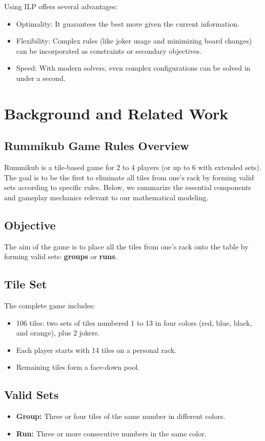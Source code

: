\documentclass[11pt,letterpaper]{article}
\begin{document}
Using ILP offers several advantages:
\begin{itemize}
    \item Optimality: It guarantees the best move given the current information.
    \item Flexibility: Complex rules (like joker usage and minimizing board changes) can be incorporated as constraints or secondary objectives.
    \item Speed: With modern solvers, even complex configurations can be solved in under a second.
\end{itemize}

\section*{Background and Related Work}
\subsection*{Rummikub Game Rules Overview}
Rummikub is a tile-based game for 2 to 4 players (or up to 6 with extended sets). The goal is to be the first to eliminate all tiles from one's rack by forming valid sets according to specific rules. Below, we summarize the essential components and gameplay mechanics relevant to our mathematical modeling.

\subsection*{Objective}
The aim of the game is to place all the tiles from one's rack onto the table by forming valid sets: \textbf{groups} or \textbf{runs}.

\subsection*{Tile Set}
The complete game includes:
\begin{itemize}
    \item 106 tiles: two sets of tiles numbered 1 to 13 in four colors (red, blue, black, and orange), plus 2 jokers.
    \item Each player starts with 14 tiles on a personal rack.
    \item Remaining tiles form a face-down pool.
\end{itemize}

\subsection*{Valid Sets}
\begin{itemize}
    \item \textbf{Group:} Three or four tiles of the same number in different colors.
    \item \textbf{Run:} Three or more consecutive numbers in the same color.
\end{itemize}
\end{document}
